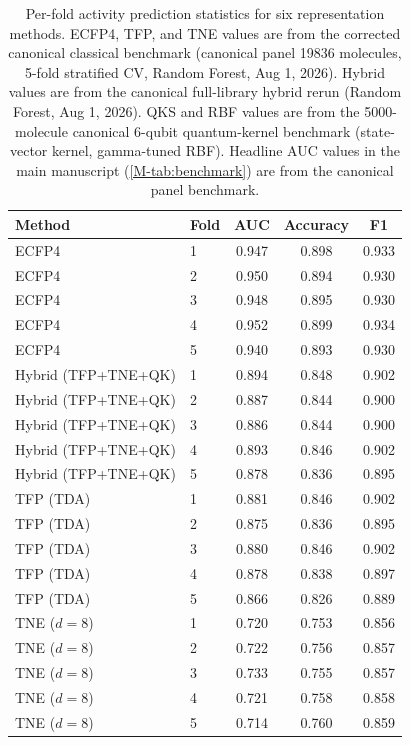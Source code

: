 \documentclass[11pt,a4paper]{article}
\begin{document}
\begin{table}[htbp]
\centering
\caption{Per-fold activity prediction statistics for six representation methods. ECFP4, TFP, and TNE values are from the corrected canonical classical benchmark (canonical panel \num{19836} molecules, 5-fold stratified CV, Random Forest, Aug 1, 2026). Hybrid values are from the canonical full-library hybrid rerun (Random Forest, Aug 1, 2026). QKS and RBF values are from the \num{5000}-molecule canonical 6-qubit quantum-kernel benchmark (state-vector kernel, gamma-tuned RBF). Headline AUC values in the main manuscript (\cref{M-tab:benchmark}) are from the canonical panel benchmark.}
\label{tab:sm_s4_perfold}
\small
\begin{tabularx}{\textwidth}{l l S[table-format=1.3] S[table-format=1.3] S[table-format=1.3]}
\toprule
Method & Fold & {AUC} & {Accuracy} & {F1} \\
\midrule
ECFP4 & 1 & 0.947 & 0.898 & 0.933 \\
ECFP4 & 2 & 0.950 & 0.894 & 0.930 \\
ECFP4 & 3 & 0.948 & 0.895 & 0.930 \\
ECFP4 & 4 & 0.952 & 0.899 & 0.934 \\
ECFP4 & 5 & 0.940 & 0.893 & 0.930 \\
\midrule
Hybrid (TFP+TNE+QK) & 1 & 0.894 & 0.848 & 0.902 \\
Hybrid (TFP+TNE+QK) & 2 & 0.887 & 0.844 & 0.900 \\
Hybrid (TFP+TNE+QK) & 3 & 0.886 & 0.844 & 0.900 \\
Hybrid (TFP+TNE+QK) & 4 & 0.893 & 0.846 & 0.902 \\
Hybrid (TFP+TNE+QK) & 5 & 0.878 & 0.836 & 0.895 \\
\midrule
TFP (TDA) & 1 & 0.881 & 0.846 & 0.902 \\
TFP (TDA) & 2 & 0.875 & 0.836 & 0.895 \\
TFP (TDA) & 3 & 0.880 & 0.846 & 0.902 \\
TFP (TDA) & 4 & 0.878 & 0.838 & 0.897 \\
TFP (TDA) & 5 & 0.866 & 0.826 & 0.889 \\
\midrule
TNE ($d=8$) & 1 & 0.720 & 0.753 & 0.856 \\
TNE ($d=8$) & 2 & 0.722 & 0.756 & 0.857 \\
TNE ($d=8$) & 3 & 0.733 & 0.755 & 0.857 \\
TNE ($d=8$) & 4 & 0.721 & 0.758 & 0.858 \\
TNE ($d=8$) & 5 & 0.714 & 0.760 & 0.859 \\

\end{tabularx}
\end{table}
\end{document}
